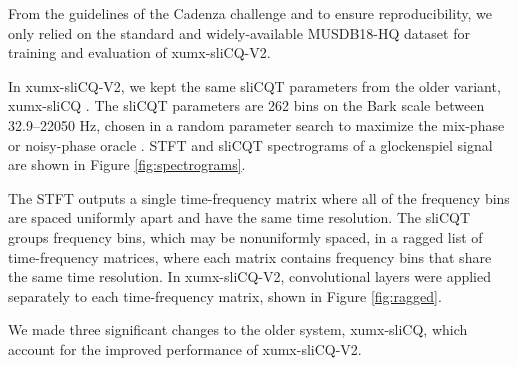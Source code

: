 \documentclass{INTERSPEECH2023}
\begin{document}
From the guidelines of the Cadenza challenge and to ensure reproducibility, we only relied on the standard and widely-available MUSDB18-HQ dataset \cite{musdb18hq} for training and evaluation of xumx-sliCQ-V2.

In xumx-sliCQ-V2, we kept the same sliCQT parameters from the older variant, xumx-sliCQ \cite{hanssian21}. The sliCQT parameters are 262 bins on the Bark scale between 32.9--22050 Hz, chosen in a random parameter search to maximize the mix-phase or noisy-phase oracle \cite{hanssian21}. STFT and sliCQT spectrograms of a glockenspiel signal are shown in Figure \ref{fig:spectrograms}.

The STFT outputs a single time-frequency matrix where all of the frequency bins are spaced uniformly apart and have the same time resolution. The sliCQT groups frequency bins, which may be nonuniformly spaced, in a ragged list of time-frequency matrices, where each matrix contains frequency bins that share the same time resolution. In xumx-sliCQ-V2, convolutional layers were applied separately to each time-frequency matrix, shown in Figure \ref{fig:ragged}.

We made three significant changes to the older system, xumx-sliCQ, which account for the improved performance of xumx-sliCQ-V2.
\end{document}
